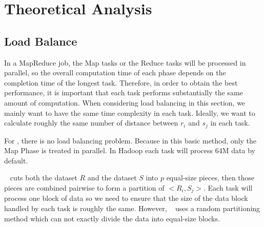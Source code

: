 \section{Theoretical Analysis}\label{analysis}
\label{sec:analysis}
\subsection{Load Balance}
\label{sec:load_balance}
In a MapReduce job, the Map tasks or the Reduce tasks will be processed in parallel, so the 
overall computation time of each phase depends on the completion time of the longest task. 
Therefore, in order to obtain the best performance, it is important that each task performs 
substantially the same amount of computation.  When considering load balancing in this section, we 
mainly want to have the same time complexity in each task. Ideally, we want to calculate roughly 
the same number of distance between $r_i$ and $s_j$ in each task.

For \HBK, there is no load balancing problem. Because in this basic method, only the Map Phase is treated in parallel. In Hadoop each task will process 64M data by default.

\HBNLJ~ cuts both the dataset $R$ and the dataset $S$ into $p$ equal-size pieces, then those pieces are 
combined pairwise to form a partition of $<R_i, S_j>$. Each task will process one block of data 
so we need to ensure that the size of the data block handled by each task is roughly the 
same. However, \HBNLJ~ uses a random partitioning method which can not exactly divide 
the data into equal-size blocks. 

